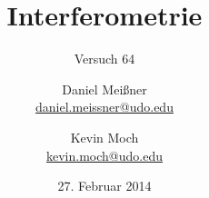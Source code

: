 

\newcommand{\name}[1]{\textsc{#1}}
\newcommand{\pdn}[3]{%
\ensuremath{\frac{\partial^{#1} #2}{\partial #3^{#1}}}}
\newcommand{\pd}[2]{%
\ensuremath{\frac{\partial #1}{\partial #2}}}
\renewcommand{\d}{\ensuremath{\mathrm{d}}}
\newcommand{\iunt}{\ensuremath{\mathrm{i}}} %

\titlehead{{TU Dortmund \hfill WS~13/14\\}
Fakultät Physik\\ Fortgeschrittenenpraktikum}

\subject{Versuchsprotokoll}
\title{Interferometrie}
\subtitle{Versuch 64}

\author{Daniel Meißner\\
{\normalsize\url{daniel.meissner@udo.edu}}
\and
Kevin Moch\\
{\normalsize\url{kevin.moch@udo.edu}}}

\date{27. Februar 2014}


\maketitle

\tableofcontents
\clearpage




